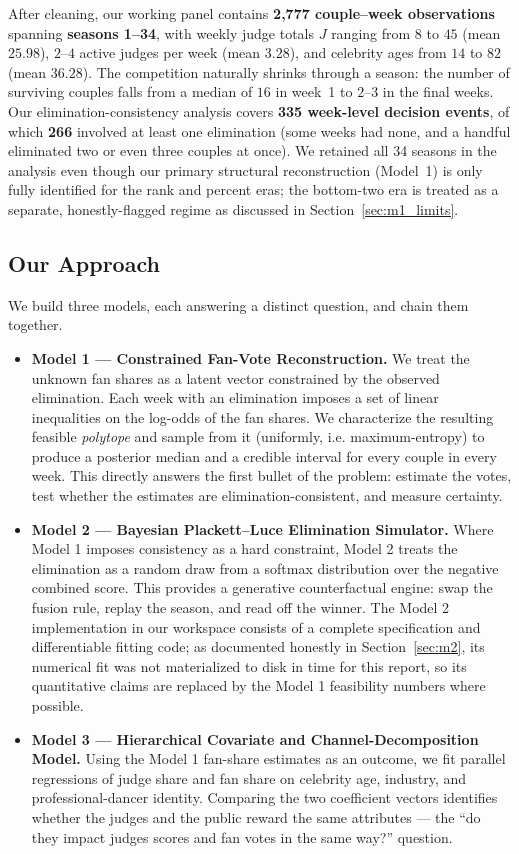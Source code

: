 \documentclass{article}
\begin{document}
After cleaning, our working panel contains \textbf{2{,}777 couple--week observations}
spanning \textbf{seasons 1--34}, with weekly judge totals $J$ ranging from $8$ to $45$
(mean $25.98$), $2$--$4$ active judges per week (mean $3.28$), and celebrity ages from
$14$ to $82$ (mean $36.28$). The competition naturally shrinks through a season: the number
of surviving couples falls from a median of $16$ in week~1 to $2$--$3$ in the final weeks.
Our elimination-consistency analysis covers \textbf{335 week-level decision events}, of
which \textbf{266} involved at least one elimination (some weeks had none, and a handful
eliminated two or even three couples at once). We retained all 34 seasons in the analysis
even though our primary structural reconstruction (Model~1) is only fully identified for
the rank and percent eras; the bottom-two era is treated as a separate, honestly-flagged
regime as discussed in Section~\ref{sec:m1_limits}.

\subsection{Our Approach}

We build three models, each answering a distinct question, and chain them together.

\begin{itemize}
\item \textbf{Model 1 --- Constrained Fan-Vote Reconstruction.} We treat the unknown fan
shares as a latent vector constrained by the observed elimination. Each week with an
elimination imposes a set of linear inequalities on the log-odds of the fan shares. We
characterize the resulting feasible \emph{polytope} and sample from it (uniformly, i.e.
maximum-entropy) to produce a posterior median and a credible interval for every couple
in every week. This directly answers the first bullet of the problem: estimate the votes,
test whether the estimates are elimination-consistent, and measure certainty.
\item \textbf{Model 2 --- Bayesian Plackett--Luce Elimination Simulator.} Where Model 1
imposes consistency as a hard constraint, Model 2 treats the elimination as a random draw
from a softmax distribution over the negative combined score. This provides a
generative counterfactual engine: swap the fusion rule, replay the season, and read off
the winner. The Model 2 implementation in our workspace consists of a complete
specification and differentiable fitting code; as documented honestly in
Section~\ref{sec:m2}, its numerical fit was not materialized to disk in time for this
report, so its quantitative claims are replaced by the Model 1 feasibility numbers where
possible.
\item \textbf{Model 3 --- Hierarchical Covariate and Channel-Decomposition Model.} Using
the Model 1 fan-share estimates as an outcome, we fit parallel regressions of judge share
and fan share on celebrity age, industry, and professional-dancer identity. Comparing the
two coefficient vectors identifies whether the judges and the public reward the same
attributes --- the ``do they impact judges scores and fan votes in the same way?'' question.
\end{itemize}
\end{document}
